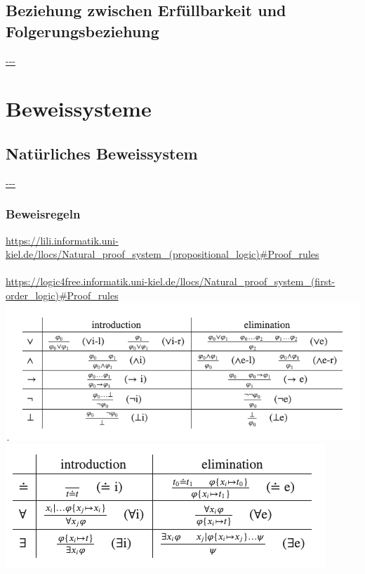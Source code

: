 \documentclass{article}
\begin{document}
    \subsection{Beziehung zwischen Erfüllbarkeit und Folgerungsbeziehung}
    \url{---}\\

    \section{Beweissysteme}

    \subsection{Natürliches Beweissystem}
    \url{---}\\

    \subsubsection{Beweisregeln}
    \url{https://lili.informatik.uni-kiel.de/llocs/Natural_proof_system_(propositional_logic)#Proof_rules}\\\\
    \url{https://logic4free.informatik.uni-kiel.de/llocs/Natural_proof_system_(first-order_logic)#Proof_rules}\\
    \includegraphics[scale=0.65]{beweisregelnaussagenlogik}\\
    \includegraphics[scale=0.9]{beweisregelnpraedikatenlogik}
\end{document}
